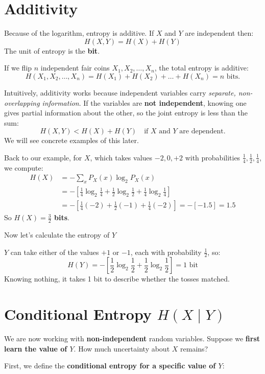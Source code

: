 \documentclass[11pt]{article}
\begin{document}
\section*{Additivity}

Because of the logarithm, entropy is additive. If $X$ and $Y$ are independent then:
\[
H(X, Y) = H(X) + H(Y)
\]
The unit of entropy is the \textbf{bit}.

If we flip $n$ independent fair coins $X_1, X_2, \dots, X_n$, the total entropy is additive:
\[
H(X_1, X_2, \dots, X_n) = H(X_1) + H(X_2) + \dots + H(X_n) = n \text{ bits}.
\]

Intuitively, additivity works because independent variables carry \emph{separate, non-overlapping information}. 
If the variables are \textbf{not independent}, knowing one gives partial information about the other, so the joint entropy is less than the sum:
\[
H(X, Y) < H(X) + H(Y) \quad \text{if $X$ and $Y$ are dependent.}
\]
We will see concrete examples of this later.


Back to our example, for $X$, which takes values $-2, 0, +2$ with probabilities $\frac{1}{4}, \frac{1}{2}, \frac{1}{4}$, we compute:
\[
\begin{aligned}
H(X) &= -\sum_x P_X(x) \log_2 P_X(x) \\
&= -\left[ \frac{1}{4} \log_2 \frac{1}{4} + \frac{1}{2} \log_2 \frac{1}{2} + \frac{1}{4} \log_2 \frac{1}{4} \right] \\
&= -\left[ \frac{1}{4}(-2) + \frac{1}{2}(-1) + \frac{1}{4}(-2) \right] = -[-1.5] = 1.5
\end{aligned}
\]
So \textbf{$H(X) = \frac{3}{2}$ bits}. 

Now let's calculate the entropy of $Y$

$Y$ can take either of the values $+1$ or $-1$, each with probability $\frac{1}{2}$, so:
\[
H(Y) = -\left[ \frac{1}{2} \log_2 \frac{1}{2} + \frac{1}{2} \log_2 \frac{1}{2} \right] = 1 \text{ bit}
\]
Knowing nothing, it takes 1 bit to describe whether the tosses matched.

\section*{Conditional Entropy $H(X \mid Y)$}

We are now working with \textbf{non-independent} random variables. Suppose we \textbf{first learn the value of $Y$}. How much uncertainty about $X$ remains?

First, we define the \textbf{conditional entropy for a specific value of $Y$}:
\end{document}
